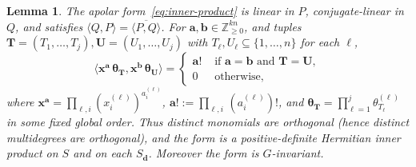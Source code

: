 \documentclass[12pt]{amsart}
\theoremstyle{plain}
\newtheorem{lemma}[theorem]{Lemma}
\theoremstyle{definition}
\begin{document}
\begin{lemma}\label{lem:apolar-props}
The apolar form~\eqref{eq:inner-product} is linear in $P$, conjugate-linear in $Q$, and satisfies $\langle Q, P\rangle = \overline{\langle P, Q\rangle}$. 
For $\bm{a}, \bm{b} \in \mathbb{Z}_{\geq 0}^{kn}$, and tuples $\bm{T}= (T_1,\ldots,T_j),\bm{U} = (U_1,\ldots,U_j)$ with $T_\ell, U_\ell \subseteq \{1,\ldots,n\}$ for each $\ell$,
\begin{equation}
    \langle \bm{x}^{\bm{a}}\, \bm{\theta}_{\bm{T}}, \bm{x}^{\bm{b}}\, \bm{\theta}_{\bm{U}} \rangle = \begin{cases}
        \bm{a}! & \text{ if } \bm{a} = \bm{b} \text{ and } \bm{T} = \bm{U},\\
        0 & \text{ otherwise,}
    \end{cases}
\end{equation}
where $\bm{x}^{\bm{a}} = \prod_{\ell,i}(x_i^{(\ell)})^{a_i^{(\ell)}}$, $\bm{a}! := \prod_{\ell, i}\, (a_i^{(\ell)})!$, and $\bm{\theta}_{\bm{T}} = \prod_{\ell=1}^j \theta^{(\ell)}_{T_\ell}$ in some fixed global order.
Thus distinct monomials are orthogonal (hence distinct multidegrees are orthogonal), and the form is a positive-definite Hermitian inner product on $S$ and on each $S_{\bm{d}}$. Moreover the form is $G$-invariant.
\end{lemma}
\end{document}
